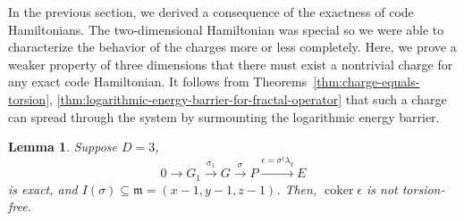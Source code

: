\documentclass[letterpaper,12pt]{amsart}
\newtheorem{lem}{Lemma}[section]
\theoremstyle{definition} \newtheorem{defn}{Definition}
\theoremstyle{definition} \newtheorem{rem}{Remark}
\theoremstyle{definition} \newtheorem{example}{Example}
\newcommand{\coker}{\mathop{\mathrm{coker}}}
\newcommand{\mm}{\mathfrak{m}}
\begin{document}
In the previous section, we derived a consequence of the exactness of code Hamiltonians.
The two-dimensional Hamiltonian was special 
so we were able to characterize the behavior of the charges more or less completely.
Here, we prove a weaker property of three dimensions that there must exist a nontrivial charge
for any exact code Hamiltonian.
It follows from Theorems~\ref{thm:charge-equals-torsion},%
\ref{thm:logarithmic-energy-barrier-for-fractal-operator}
that such a charge can spread through the system
by surmounting the logarithmic energy barrier.
\begin{lem}
Suppose $D=3$,
\[
  0 \to G_1 \xrightarrow{\sigma_1} G \xrightarrow{\sigma} P \xrightarrow{\epsilon=\sigma^\dagger \lambda_q} E
\]
is exact, and $I(\sigma) \subseteq \mm = (x-1,y-1,z-1)$.
Then, $\coker \epsilon$ is not torsion-free.
\label{lem:char-ideal-with-support-on-origin-implies-fractal}
\end{lem}
\end{document}
